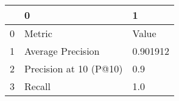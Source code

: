 \begin{tabular}{lll}
\toprule
{} &                       0 &         1 \\
\midrule
0 &                  Metric &     Value \\
1 &       Average Precision &  0.901912 \\
2 &  Precision at 10 (P@10) &       0.9 \\
3 &                  Recall &       1.0 \\
\bottomrule
\end{tabular}
